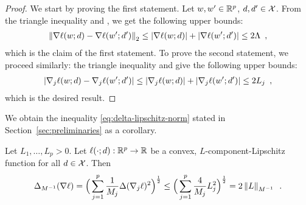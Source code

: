 \begin{proof}
  We start by proving the first statement.
  Let $w, w' \in \mathbb R^p$, $d, d' \in \mathcal X$.
  From the triangle inequality and , we get
  the following
  upper bounds:
  \begin{align}
    \left \lVert \nabla \ell(w; d) - \nabla \ell(w'; d') \right \rVert_2
    \le \left| \nabla \ell(w; d) \right| + \left| \nabla \ell(w'; d') \right|
    \le 2\Lambda\enspace,
  \end{align}
  which is the claim of the first statement.
  To prove the second statement, we proceed similarly: the triangle inequality
  and  give the following upper bounds:
  \begin{align}
    \left| \nabla_j \ell(w; d) - \nabla_j \ell(w'; d') \right|
    \le \left| \nabla_j \ell(w; d) \right| + \left| \nabla_j \ell(w'; d') \right|
    \le 2L_j\enspace,
  \end{align}
  which is the desired result.
\end{proof}

We obtain the inequality \eqref{eq:delta-lipschitz-norm} stated in
Section~\ref{sec:preliminaries} as a corollary.

\begin{corollary}
  Let $L_1, \dots, L_p > 0$.
  Let $\ell(\cdot; d) : \mathbb R^p \rightarrow \mathbb R$ be a convex,
  $L$-component-Lipschitz function for all $d \in \mathcal X$.
  Then
  \begin{align}
    \Delta_{M^{-1}}(\nabla \ell)
    = \Big(\sum_{j=1}^p \frac{1}{M_j} \Delta (\nabla_j\ell)^2\Big)^{\frac{1}
    {2}}
    \le \Big(\sum_{j=1}^p \frac{4}{M_j} L_j^2\Big)^{\frac{1}{2}}
    = 2 \left \lVert L \right \rVert_{M^{-1}}\enspace.
  \end{align}
\end{corollary}




